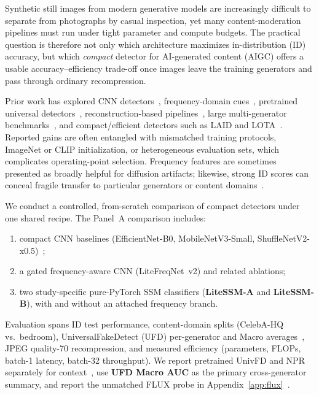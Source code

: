 Synthetic still images from modern generative models are increasingly difficult to separate from photographs by casual inspection, yet many content-moderation pipelines must run under tight parameter and compute budgets.
The practical question is therefore not only which architecture maximizes in-distribution (ID) accuracy, but which \emph{compact} detector for AI-generated content (AIGC) offers a usable accuracy--efficiency trade-off once images leave the training generators and pass through ordinary recompression.

Prior work has explored CNN detectors~\cite{wang2020cnn,tan2019efficientnet}, frequency-domain cues~\cite{frank2020freq}, pretrained universal detectors~\cite{ojha2023ufd,liu2024fatformer}, reconstruction-based pipelines~\cite{wang2023dire}, large multi-generator benchmarks~\cite{zhu2023genimage}, and compact/efficient detectors such as LAID and LOTA~\cite{chivaran2025laid,wang2025lota}.
Reported gains are often entangled with mismatched training protocols, ImageNet or CLIP initialization, or heterogeneous evaluation sets, which complicates operating-point selection.
Frequency features are sometimes presented as broadly helpful for diffusion artifacts; likewise, strong ID scores can conceal fragile transfer to particular generators or content domains~\cite{ojha2023ufd}.

We conduct a controlled, from-scratch comparison of compact detectors under one shared recipe.
The Panel~A comparison includes:
\begin{enumerate}
\item compact CNN baselines (EfficientNet-B0, MobileNetV3-Small, ShuffleNetV2-x0.5)~\cite{tan2019efficientnet,howard2019mobilenetv3,ma2018shufflenet};
\item a gated frequency-aware CNN (LiteFreqNet~v2) and related ablations;
\item two study-specific pure-PyTorch SSM classifiers (\textbf{LiteSSM-A} and \textbf{LiteSSM-B}), with and without an attached frequency branch.
\end{enumerate}

Evaluation spans ID test performance, content-domain splits (CelebA-HQ vs.\ bedroom), UniversalFakeDetect (UFD) per-generator and Macro averages~\cite{ojha2023ufd}, JPEG quality-70 recompression, and measured efficiency (parameters, FLOPs, batch-1 latency, batch-32 throughput).
We report pretrained UnivFD and NPR separately for context~\cite{ojha2023ufd,tan2024npr}, use \textbf{UFD Macro AUC} as the primary cross-generator summary, and report the unmatched FLUX probe in Appendix~\ref{app:flux}~\cite{flux2024}.

